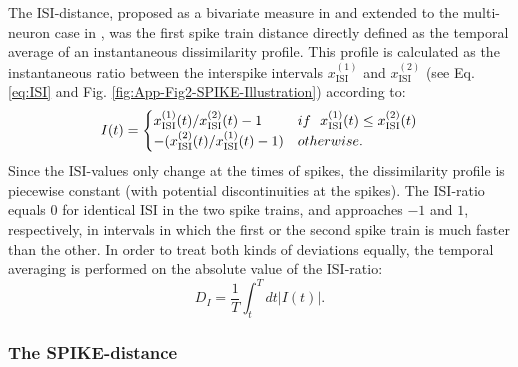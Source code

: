 \documentclass[10pt,twocolumn]{elsart5p}
\begin{document}
\begin{appendix}
The ISI-distance, proposed as a bivariate measure in \citep{Kreuz07c} and extended to the multi-neuron case in \citep{Kreuz09}, was the first spike train distance directly defined as the temporal average of an instantaneous dissimilarity profile. This profile is calculated as the instantaneous ratio between the interspike intervals $x_{\mathrm {ISI}}^{(1)}$ and $x_{\mathrm {ISI}}^{(2)}$ (see Eq. \ref{eq:ISI} and Fig. \ref{fig:App-Fig2-SPIKE-Illustration}) according to:
%
\begin{equation} \label{eq:ISI-Ratio}
    I (t) = \begin{cases}
           x_{\mathrm {ISI}}^{(1)} (t) / x_{\mathrm {ISI}}^{(2)} (t) - 1 & {\rm if} ~~ x_{\mathrm {ISI}}^{(1)} (t) \leq x_{\mathrm {ISI}}^{(2)} (t) \cr
                      - (x_{\mathrm {ISI}}^{(2)} (t) / x_{\mathrm {ISI}}^{(1)} (t) -1)     & {\rm otherwise}.
                  \end{cases}
\end{equation}
%
Since the ISI-values only change at the times of spikes, the dissimilarity profile is piecewise constant (with potential discontinuities at the spikes). The ISI-ratio equals $0$ for identical ISI in the two spike trains, and approaches $-1$ and $1$, respectively, in intervals in which the first or the second spike train is much faster than the other. In order to treat both kinds of deviations equally, the temporal averaging is performed on the absolute value of the ISI-ratio:
%
\begin{equation} \label{eq:Temporal-Average}
    D_I = \frac{1}{T} \int_{t}^T dt |I (t)|.
\end{equation}


\subsubsection{\label{App-sss:SPIKE-Distance} The SPIKE-distance}


\end{appendix}
\end{document}
